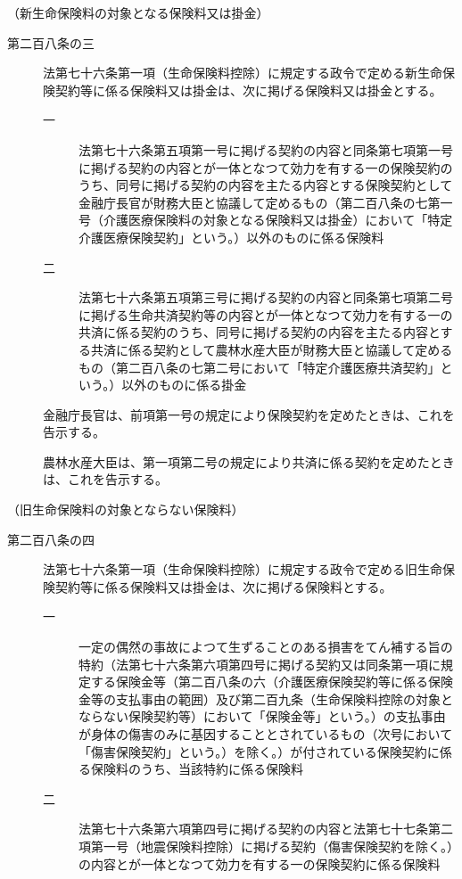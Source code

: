 \documentclass[twocolumn,a4j,10pt]{ltjtarticle}
\begin{document}
\noindent\hspace{10pt}（新生命保険料の対象となる保険料又は掛金）
\begin{description}
\item[第二百八条の三]法第七十六条第一項（生命保険料控除）に規定する政令で定める新生命保険契約等に係る保険料又は掛金は、次に掲げる保険料又は掛金とする。
\begin{description}
\item[一]法第七十六条第五項第一号に掲げる契約の内容と同条第七項第一号に掲げる契約の内容とが一体となつて効力を有する一の保険契約のうち、同号に掲げる契約の内容を主たる内容とする保険契約として金融庁長官が財務大臣と協議して定めるもの（第二百八条の七第一号（介護医療保険料の対象となる保険料又は掛金）において「特定介護医療保険契約」という。）以外のものに係る保険料
\item[二]法第七十六条第五項第三号に掲げる契約の内容と同条第七項第二号に掲げる生命共済契約等の内容とが一体となつて効力を有する一の共済に係る契約のうち、同号に掲げる契約の内容を主たる内容とする共済に係る契約として農林水産大臣が財務大臣と協議して定めるもの（第二百八条の七第二号において「特定介護医療共済契約」という。）以外のものに係る掛金
\end{description}
\item[]金融庁長官は、前項第一号の規定により保険契約を定めたときは、これを告示する。
\item[]農林水産大臣は、第一項第二号の規定により共済に係る契約を定めたときは、これを告示する。
\end{description}
\noindent\hspace{10pt}（旧生命保険料の対象とならない保険料）
\begin{description}
\item[第二百八条の四]法第七十六条第一項（生命保険料控除）に規定する政令で定める旧生命保険契約等に係る保険料又は掛金は、次に掲げる保険料とする。
\begin{description}
\item[一]一定の偶然の事故によつて生ずることのある損害をてん補する旨の特約（法第七十六条第六項第四号に掲げる契約又は同条第一項に規定する保険金等（第二百八条の六（介護医療保険契約等に係る保険金等の支払事由の範囲）及び第二百九条（生命保険料控除の対象とならない保険契約等）において「保険金等」という。）の支払事由が身体の傷害のみに基因することとされているもの（次号において「傷害保険契約」という。）を除く。）が付されている保険契約に係る保険料のうち、当該特約に係る保険料
\item[二]法第七十六条第六項第四号に掲げる契約の内容と法第七十七条第二項第一号（地震保険料控除）に掲げる契約（傷害保険契約を除く。）の内容とが一体となつて効力を有する一の保険契約に係る保険料
\end{description}
\end{description}
\end{document}
